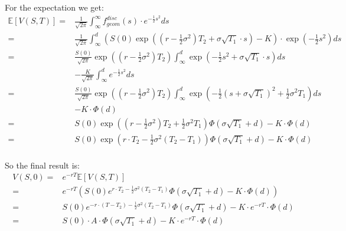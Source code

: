 \documentclass[a4paper,10pt]{article}
\begin{document}
For the expectation we get:
\begin{align*}
 \mathbb{E}\left[ V\left(S,T\right)\right] = & \frac{1}{\sqrt{2\pi}}\int_\infty^\infty f_{geom}^{disc}\left(s\right) \cdot e^{-\frac{1}{2}s^2} ds\\
  = & \frac{1}{\sqrt{2\pi}} \int_\infty^d \left(S(0) \exp\left(\left(r-\frac{1}{2}\sigma^2\right)T_2+\sigma\sqrt{T_1}\cdot s\right)-K\right) \cdot \exp\left(-\frac{1}{2}s^2\right) ds\\
  =& \frac{S(0)}{\sqrt{2\pi}} \exp\left(\left(r-\frac{1}{2}\sigma^2\right)T_2\right) \int_\infty^d \exp\left(-\frac{1}{2}s^2 + \sigma\sqrt{T_1}\cdot s\right) ds\\
   & -\frac{K}{\sqrt{2\pi}} \int_\infty^d e^{-\frac{1}{2}s^2} ds\\
  =& \frac{S(0)}{\sqrt{2\pi}} \exp\left(\left(r-\frac{1}{2}\sigma^2\right)T_2 \right) \int_\infty^d \exp\left( -\frac{1}{2}(s+\sigma\sqrt{T_1})^2+\frac{1}{2}\sigma^2 T_1\right) ds\\
   & -K \cdot \Phi(d)\\
  =& S(0) \exp\left(\left(r-\frac{1}{2}\sigma^2\right)T_2 +\frac{1}{2}\sigma^2 T_1 \right) \Phi\left(\sigma \sqrt{T_1} + d\right) -K \cdot \Phi(d)\\
  =& S(0) \exp\left(r \cdot T_2 -\frac{1}{2}\sigma^2 \left(T_2 - T_1\right) \right) \Phi\left(\sigma \sqrt{T_1} + d\right) -K \cdot \Phi(d)\\
\end{align*}

So the final result is:
\begin{align*}
 V(S,0) = & e^{-r T}\mathbb{E}\left[ V\left(S,T\right)\right]\\
        = & e^{-r T} \left( S(0) e^{r \cdot T_2 -\frac{1}{2}\sigma^2 \left(T_2 - T_1\right) } \Phi\left(\sigma \sqrt{T_1} + d\right) -K \cdot \Phi(d) \right)\\
        = & S(0) e^{-r \cdot (T - T_2) -\frac{1}{2}\sigma^2 \left(T_2 - T_1\right) } \Phi\left(\sigma \sqrt{T_1} + d\right) -K \cdot e^{-r T} \cdot \Phi(d)\\
        = & S(0) \cdot A \cdot \Phi \left(\sigma \sqrt{T_1} + d\right) -K \cdot e^{-r T} \cdot \Phi(d)\\
\end{align*}
\flushright{$\qed$}
\end{document}
